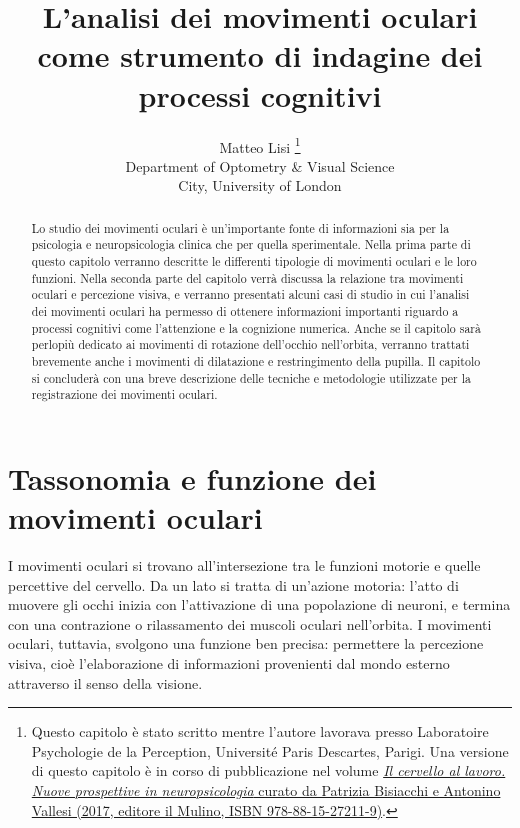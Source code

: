 \documentclass[12pt]{article}
\title{L'analisi dei movimenti oculari come strumento di indagine dei processi cognitivi}
\author{
        Matteo Lisi \footnote{\scriptsize{Questo capitolo è stato scritto mentre l'autore lavorava presso Laboratoire Psychologie de la Perception, Université Paris Descartes, Parigi. Una versione di questo capitolo è in corso di pubblicazione nel volume \href{https://www.mulino.it/isbn/9788815272119}{\textit{Il cervello al lavoro. Nuove prospettive in neuropsicologia} curato da Patrizia Bisiacchi e Antonino Vallesi (2017, editore il Mulino, ISBN 978-88-15-27211-9)}.}} \\
        \small{Department of Optometry \& Visual Science}\\
        \small{City, University of London}
}
\date{}
\begin{document}
\sloppy
\maketitle

\begin{abstract}
Lo studio dei movimenti oculari \`e un'importante fonte di informazioni sia per la psicologia e neuropsicologia clinica che per quella sperimentale. Nella prima parte di questo capitolo verranno descritte le differenti tipologie di movimenti oculari e le loro funzioni. Nella seconda parte del capitolo verrà discussa la relazione tra movimenti oculari e percezione visiva, e verranno presentati alcuni casi di studio in cui l'analisi dei movimenti oculari ha permesso di ottenere informazioni importanti riguardo a processi cognitivi come l'attenzione e la cognizione numerica. Anche se il capitolo sarà perlopiù dedicato ai movimenti di rotazione dell'occhio nell'orbita, verranno trattati brevemente anche i movimenti di dilatazione e restringimento della pupilla. Il capitolo si concluderà con una breve descrizione delle tecniche e metodologie utilizzate per la registrazione dei movimenti oculari.
\end{abstract}

\section{Tassonomia e funzione dei movimenti oculari}
I movimenti oculari si trovano all'intersezione tra le funzioni motorie e quelle percettive del cervello. Da un lato si tratta di un'azione motoria: l'atto di muovere gli occhi inizia con l'attivazione di una popolazione di neuroni, e termina con una contrazione o rilassamento dei muscoli oculari nell'orbita. I movimenti oculari, tuttavia, svolgono una funzione ben precisa: permettere la percezione visiva, cio\`e l'elaborazione di informazioni provenienti dal mondo esterno attraverso il senso della visione. 
\end{document}
